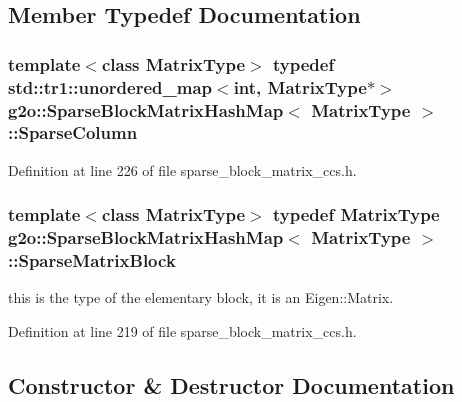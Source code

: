 \subsection{Member Typedef Documentation}
\subsubsection[{\texorpdfstring{Sparse\+Column}{SparseColumn}}]{\setlength{\rightskip}{0pt plus 5cm}template$<$class Matrix\+Type$>$ typedef std\+::tr1\+::unordered\+\_\+map$<$int, Matrix\+Type$\ast$$>$ {\bf g2o\+::\+Sparse\+Block\+Matrix\+Hash\+Map}$<$ Matrix\+Type $>$\+::{\bf Sparse\+Column}}\hypertarget{classg2o_1_1SparseBlockMatrixHashMap_ae364a722296b90e32dd6c3a8fbeb49ae}{}\label{classg2o_1_1SparseBlockMatrixHashMap_ae364a722296b90e32dd6c3a8fbeb49ae}


Definition at line 226 of file sparse\+\_\+block\+\_\+matrix\+\_\+ccs.\+h.

\subsubsection[{\texorpdfstring{Sparse\+Matrix\+Block}{SparseMatrixBlock}}]{\setlength{\rightskip}{0pt plus 5cm}template$<$class Matrix\+Type$>$ typedef Matrix\+Type {\bf g2o\+::\+Sparse\+Block\+Matrix\+Hash\+Map}$<$ Matrix\+Type $>$\+::{\bf Sparse\+Matrix\+Block}}\hypertarget{classg2o_1_1SparseBlockMatrixHashMap_a03d422844dbf0b10f4fcf7e69fdb0bca}{}\label{classg2o_1_1SparseBlockMatrixHashMap_a03d422844dbf0b10f4fcf7e69fdb0bca}


this is the type of the elementary block, it is an Eigen\+::\+Matrix. 



Definition at line 219 of file sparse\+\_\+block\+\_\+matrix\+\_\+ccs.\+h.



\subsection{Constructor \& Destructor Documentation}
